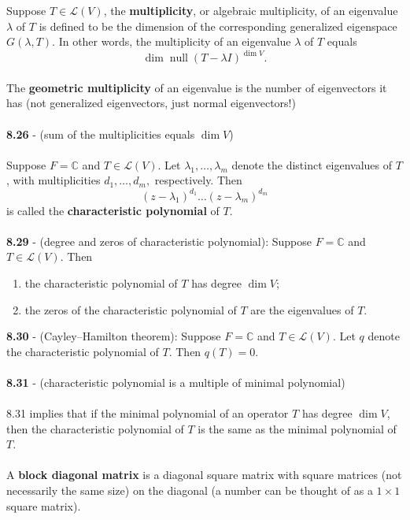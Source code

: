 \documentclass{article}
\DeclareMathOperator{\Null}{null}
\DeclareMathOperator{\Dim}{dim}
\theoremstyle{definition}
\begin{document}
Suppose $T \in \mathcal{L}(V)$, the \textbf{multiplicity}, or algebraic multiplicity, of an eigenvalue $\lambda$ of $T$ is defined to be the dimension of the corresponding generalized eigenspace $G(\lambda, T)$. In other words, the multiplicity of an eigenvalue $\lambda$ of $T$ equals $$\Dim{\Null{(T - \lambda I)^{\Dim{V}}}}.$$ \\
The \textbf{geometric multiplicity} of an eigenvalue is the number of eigenvectors it has (not generalized eigenvectors, just normal eigenvectors!) \\ \\
\textbf{8.26} - (sum of the multiplicities equals $\Dim{V}$) \\ \\
Suppose $F = \mathbb{C}$ and $T \in \mathcal{L}(V)$. Let $\lambda_1, \dots, \lambda_m$ denote the distinct eigenvalues of $T$, with multiplicities $d_1, \dots, d_m,$ respectively. Then $$(z - \lambda_1)^{d_1} \dots (z - \lambda_m)^{d_m}$$ is called the \textbf{characteristic polynomial} of $T$. \\ \\
\textbf{8.29} - (degree and zeros of characteristic polynomial): Suppose $F = \mathbb{C}$ and $T \in \mathcal{L}(V)$. Then \begin{enumerate}
    \item the characteristic polynomial of $T$ has degree $\Dim{V}$;
    \item the zeros of the characteristic polynomial of $T$ are the eigenvalues of $T$.
\end{enumerate} $ $ \\
\textbf{8.30} - (Cayley–Hamilton theorem): Suppose $F = \mathbb{C}$ and $T \in \mathcal{L}(V)$. Let $q$ denote the characteristic polynomial of $T$. Then $q(T) = 0$. \\ \\
\textbf{8.31} - (characteristic polynomial is a multiple of minimal polynomial) \\ \\
8.31 implies that if the minimal polynomial of an operator $T$ has degree $\Dim{V}$, then the characteristic polynomial of $T$ is the same as the minimal polynomial of $T$. \\ \\
A \textbf{block diagonal matrix} is a diagonal square matrix with square matrices (not necessarily the same size) on the diagonal (a number can be thought of as a $1 \times 1$ square matrix). \\ \\
\end{document}
